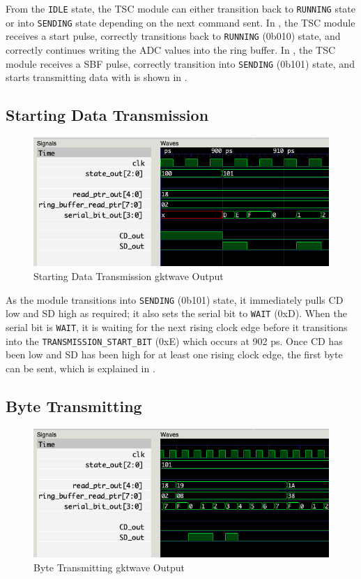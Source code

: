 From the \texttt{IDLE} state, the TSC module can either transition back to \texttt{RUNNING} state or into \texttt{SENDING} state depending on the next command sent.
In , the TSC module receives a start pulse, correctly transitions back to \texttt{RUNNING} (0b010) state, and correctly continues writing the ADC values into the ring buffer.
In , the TSC module receives a SBF pulse, correctly transition into \texttt{SENDING} (0b101) state, and starts transmitting data with is shown in .

\subsection{Starting Data Transmission}\label{subsec:starting-data-transmission}
\begin{figure}[H]
    \centering
    \includegraphics[width=\columnwidth]{Figures/Htransmit_start}
    \caption{Starting Data Transmission gktwave Output}
    \label{fig:testH}
\end{figure}

As the module transitions into \texttt{SENDING} (0b101) state, it immediately pulls CD low and SD high as required; it also sets the serial bit to \texttt{WAIT} (0xD).
When the serial bit is \texttt{WAIT}, it is waiting for the next rising clock edge before it transitions into the \texttt{TRANSMISSION\_\texttt{START\_BIT}} (0xE) which occurs at 902 ps.
Once CD has been low and SD has been high for at least one rising clock edge, the first byte can be sent, which is explained in .

\subsection{Byte Transmitting}\label{subsec:byte-transmitting}
\begin{figure}[H]
    \centering
    \includegraphics[width=\columnwidth]{Figures/Ibyte_transmit}
    \caption{Byte Transmitting gktwave Output}
    \label{fig:testI}
\end{figure}

